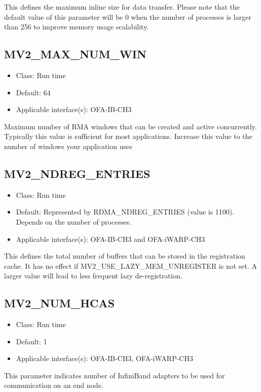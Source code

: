 This defines the maximum inline size for data transfer. Please note that the 
default value of this parameter will be 0 when the number of processes is larger than
256 to improve memory usage scalability.


\subsection{MV2\_MAX\_NUM\_WIN}
\label{def:max-num-win}
\begin{itemize}
    \item Class: Run time
    \item Default: 64
    \item Applicable interface(s): OFA-IB-CH3
\end{itemize}

Maximum number of RMA windows that can be created and active
concurrently. Typically this value is sufficient for most
applications. Increase this value to the number of windows your
application uses


\subsection{MV2\_NDREG\_ENTRIES}
\label{def:ndreg-entries}
\begin{itemize}
    \item Class: Run time
    \item Default: Represented by RDMA\_NDREG\_ENTRIES (value is 1100). Depends 
        on the number of processes.
    \item Applicable interface(s): OFA-IB-CH3 and OFA-iWARP-CH3
\end{itemize}

This defines the total number of buffers that can be stored in the
registration cache. It has no effect if MV2\_USE\_LAZY\_MEM\_UNREGISTER is
not set. A larger value will lead to less frequent lazy
de-registration.

\subsection{MV2\_NUM\_HCAS}
\label{def:num-hcas}
\begin{itemize}
    \item Class: Run time
    \item Default: 1
    \item Applicable interface(s): OFA-IB-CH3, OFA-iWARP-CH3
\end{itemize}
This parameter indicates number of InfiniBand adapters to be used for communication
on an end node.

